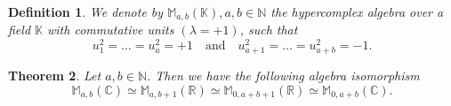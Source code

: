 \documentclass{article}
\newtheorem{theorem}{Theorem}
\newtheorem{definition}[theorem]{Definition}
\begin{document}
\begin{definition}
    \label{Diagonal basis in hypercomplex algebras : definition pre-multicomplex/multiperplex}
    We denote by $\mathbb{M}_{a,b}(\mathbb{K}), a,b \in \mathbb{N}$ the hypercomplex algebra over a field $\mathbb{K}$ with commutative units $(\lambda = +1)$, such that
    $$ u_1^2 = \ldots = u_a^2 = +1 \quad \text{and} \quad u_{a+1}^2 = \ldots = u_{a+b}^2 = -1. $$
\end{definition}
\begin{theorem}
    \label{Diagonal basis in hypercomplex algebras : thm equivalence of multicomplex spaces}
    Let $a,b \in \mathbb{N}$. Then we have the following algebra isomorphism
    $$ \mathbb{M}_{a,b}(\mathbb{C}) \simeq \mathbb{M}_{a,b+1}(\mathbb{R}) \simeq \mathbb{M}_{0,a+b+1}(\mathbb{R}) \simeq \mathbb{M}_{0,a+b}(\mathbb{C}). $$
\end{theorem}
\end{document}
